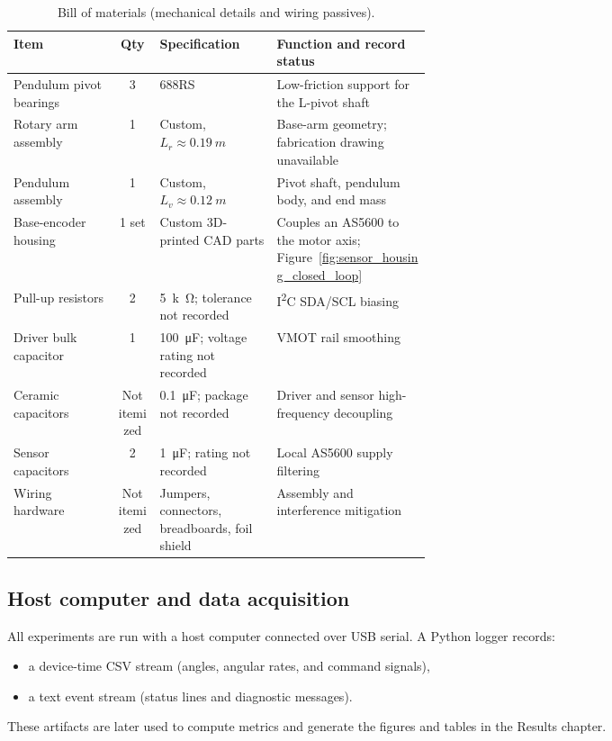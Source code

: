 \begin{table}[htbp]
  \centering
  \footnotesize
  \setlength{\tabcolsep}{5pt}
  \caption{Bill of materials (mechanical details and wiring passives).}
  \label{tab:bom_passive}
  \begin{tabularx}{\linewidth}{@{}p{0.25\linewidth} c p{0.29\linewidth} X@{}}
    \toprule
    Item & Qty & Specification & Function and record status \\
    \midrule
    Pendulum pivot bearings & 3 & 688RS & Low-friction support for the L-pivot shaft \\
    Rotary arm assembly & 1 & Custom, $L_r\approx\SI{0.19}{m}$ & Base-arm geometry; fabrication drawing unavailable \\
    Pendulum assembly & 1 & Custom, $L_v\approx\SI{0.12}{m}$ & Pivot shaft, pendulum body, and end mass \\
    Base-encoder housing & 1 set & Custom 3D-printed CAD parts & Couples an AS5600 to the motor axis; Figure~\ref{fig:sensor_housing_closed_loop} \\
    Pull-up resistors & 2 & \SI{5}{k\ohm}; tolerance not recorded & I\textsuperscript{2}C SDA/SCL biasing \\
    Driver bulk capacitor & 1 & \SI{100}{\micro\farad}; voltage rating not recorded & VMOT rail smoothing \\
    Ceramic capacitors & Not itemized & \SI{0.1}{\micro\farad}; package not recorded & Driver and sensor high-frequency decoupling \\
    Sensor capacitors & 2 & \SI{1}{\micro\farad}; rating not recorded & Local AS5600 supply filtering \\
    Wiring hardware & Not itemized & Jumpers, connectors, breadboards, foil shield & Assembly and interference mitigation \\
    \bottomrule
  \end{tabularx}
\end{table}

\subsection{Host computer and data acquisition}
All experiments are run with a host computer connected over USB serial. A Python logger records:
\begin{itemize}
  \item a device-time CSV stream (angles, angular rates, and command signals),
  \item a text event stream (status lines and diagnostic messages).
\end{itemize}
These artifacts are later used to compute metrics and generate the figures and tables in the Results chapter.

